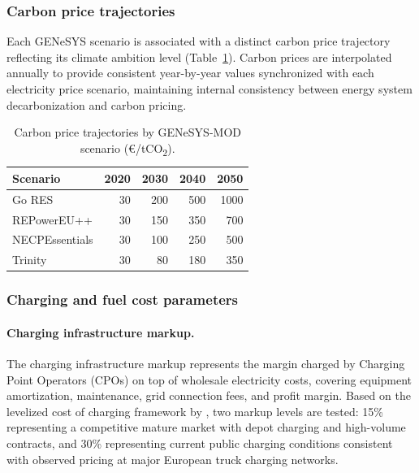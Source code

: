 \documentclass[preprint,10pt,review, authoryear]{elsarticle}
\begin{document}
        \subsubsection{Carbon price trajectories}
        Each GENeSYS scenario is associated with a distinct carbon price trajectory reflecting its climate ambition level (Table~\ref{tab:carbon_trajectories}). Carbon prices are interpolated annually to provide consistent year-by-year values synchronized with each electricity price scenario, maintaining internal consistency between energy system decarbonization and carbon pricing.

        \begin{table}[H]
            \centering
            \caption{Carbon price trajectories by GENeSYS-MOD scenario (\euro/tCO\textsubscript{2}).}
            \label{tab:carbon_trajectories}
            \begin{tabular}{@{}lrrrr@{}}
            \toprule
            \textbf{Scenario} & \textbf{2020} & \textbf{2030} & \textbf{2040} & \textbf{2050} \\ \midrule
            Go RES & 30 & 200 & 500 & 1000 \\
            REPowerEU++  & 30 & 150 & 350 & 700 \\
            NECPEssentials  & 30 & 100 & 250 & 500 \\
            Trinity  & 30 & 80 & 180 & 350 \\ \bottomrule
            \end{tabular}
        \end{table}

        \subsubsection{Charging and fuel cost parameters}
        \paragraph*{Charging infrastructure markup.} The charging infrastructure markup represents the margin charged by Charging Point Operators (CPOs) on top of wholesale electricity costs, covering equipment amortization, maintenance, grid connection fees, and profit margin. Based on the levelized cost of charging framework by \citet{Lanz2022}, two markup levels are tested: 15\% representing a competitive mature market with depot charging and high-volume contracts, and 30\% representing current public charging conditions consistent with observed pricing at major European truck charging networks.
\end{document}
